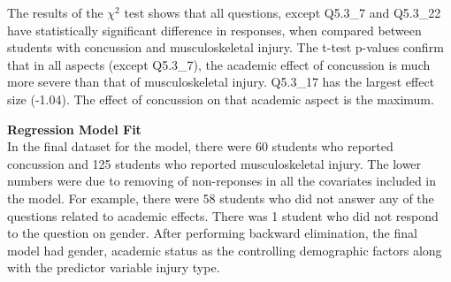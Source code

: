 \documentclass[12]{article}
\begin{document}
The results of the $\chi^2$ test shows that all questions, except Q5.3\_7 and Q5.3\_22 have statistically significant difference in responses, when compared between students with concussion and musculoskeletal injury. The t-test p-values confirm that in all aspects (except Q5.3\_7), the academic effect of concussion is much more severe than that of musculoskeletal injury. Q5.3\_17 has the largest effect size (-1.04). The effect of concussion on that academic aspect is the maximum. 


\noindent
{\bf{ Regression Model Fit}}\\
In the final dataset for the model, there were 60 students who reported concussion and 125 students who reported musculoskeletal injury. The lower numbers were due to removing of non-reponses in all the covariates included in the model. For example, there were 58 students who did not answer any of the questions related to academic effects. There was 1 student who did not respond to the question on gender. After performing backward elimination, the final model had gender, academic status as the controlling demographic factors along with the predictor variable injury type. 
\end{document}
